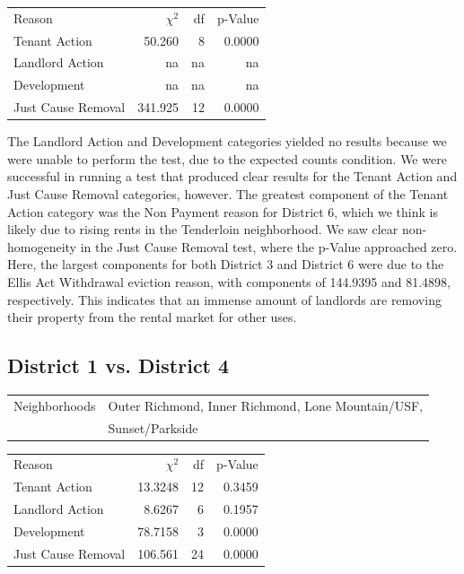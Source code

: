 \documentclass[]{article}
\begin{document}
\begin {table}[h]
\centering
\begin{tabular}{l | r | r | r}	
Reason				 &  $\chi ^{2}$ & df    & p-Value   \\
Tenant Action 		 &  50.260      &  8    & 0.0000    \\
Landlord Action	     &  na          &  na   & na        \\
Development			 &  na          &  na   & na        \\
Just Cause Removal	 &  341.925     &  12   & 0.0000    \\
\end{tabular} \newline
\end{table}

The Landlord Action and Development categories yielded no results because we were unable to perform the test, due to the expected counts condition. We were successful in running a test that produced clear results for the Tenant Action and Just Cause Removal categories, however. The greatest component of the Tenant Action category was the Non Payment reason for District 6, which we think is likely due to rising rents in the Tenderloin neighborhood.
\newline\newline
We saw clear non-homogeneity in the Just Cause Removal test, where the p-Value approached zero. Here, the largest components for both District 3 and District 6 were due to the Ellis Act Withdrawal eviction reason, with components of 144.9395 and 81.4898, respectively. This indicates that an immense amount of landlords are removing their property from the rental market for other uses.

\subsection{District 1 vs. District 4}
\begin{table}[!h]
\centering
\begin{tabular}{l | l}
Neighborhoods &  Outer Richmond, Inner Richmond, Lone Mountain/USF,  \\ 
			  &  Sunset/Parkside \\
\end{tabular}
\end{table}

\begin {table}[!h]
\centering
\begin{tabular}{l | r | r | r}	
Reason				 &  $\chi ^{2}$ & df    & p-Value   \\
Tenant Action 		 &  13.3248     & 12    & 0.3459    \\
Landlord Action	     &  8.6267      & 6     & 0.1957    \\
Development			 &  78.7158     & 3     & 0.0000    \\
Just Cause Removal	 &  106.561     & 24    & 0.0000    \\
\end{tabular} \newline
\end{table}
\end{document}
